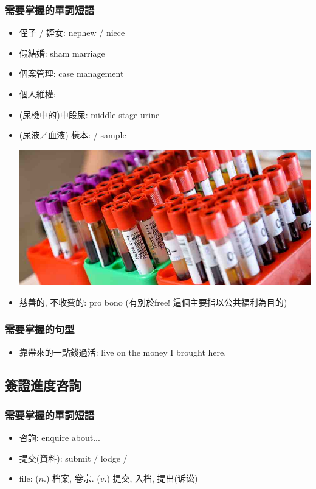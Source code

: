 \subsubsection*{需要掌握的單詞短語}
\begin{itemize}
  \itemsep0em
  \item 侄子 / 姪女: nephew / niece
  \item 假結婚: sham marriage
  \item 個案管理: case management
  \item 個人維權: 
  \item (尿檢中的)中段尿: middle stage urine
  \item (尿液／血液) 樣本:  / sample
  \begin{center}
    \includegraphics[scale=0.4]{pics/blood-sample}
  \end{center}
  \item 慈善的, 不收費的: pro bono (有別於free! 這個主要指以公共福利為目的)
\end{itemize}

\subsubsection*{需要掌握的句型}
\begin{itemize}
  \itemsep0em
  \item 靠帶來的一點錢過活: live on the money I brought here.
\end{itemize}

\subsection{簽證進度咨詢}
\subsubsection*{需要掌握的單詞短語}
\begin{itemize}
  \itemsep0em
  \item 咨詢: enquire about...
  \item 提交(資料): submit / lodge / 
  \item file: ($n.$) 档案, 卷宗. ($v.$) 提交, 入档, 提出(诉讼)
\end{itemize}

